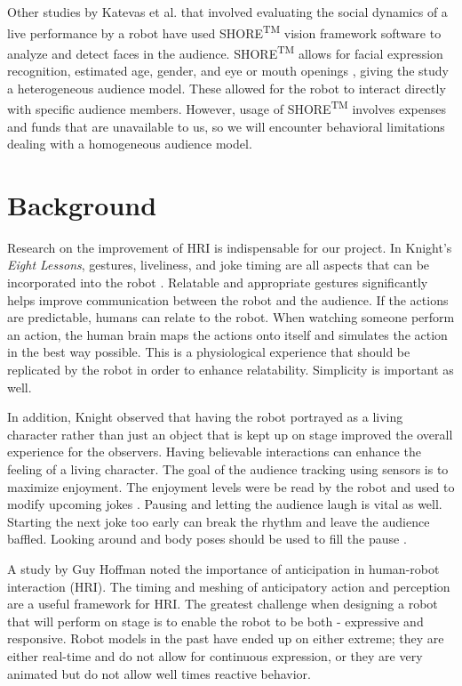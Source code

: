 \documentclass[onecolumn, draftclsnofoot,10pt, compsoc]{IEEEtran}
\begin{document}
Other studies by Katevas et al. \cite{KatevasRobot:2014} that involved evaluating the social dynamics of a live performance by a robot have used SHORE\textsuperscript{TM} vision framework software to analyze and detect faces in the audience. SHORE\textsuperscript{TM} allows for facial expression recognition, estimated age, gender, and eye or mouth openings \cite{SHORE}, giving the study a heterogeneous audience model. These allowed for the robot to interact directly with specific audience members. However, usage of SHORE\textsuperscript{TM} involves expenses and funds that are unavailable to us, so we will encounter behavioral limitations dealing with a homogeneous audience model.


\section{Background}

Research on the improvement of HRI is indispensable for our project. In Knight's \textit{Eight Lessons}, gestures, liveliness, and joke timing are all aspects that can be incorporated into the robot {\cite{KnightEightLessons:2011}}.
Relatable and appropriate gestures significantly helps improve communication between the robot and the audience. If the actions are predictable, humans can relate to the robot.
When watching someone perform an action, the human brain maps the actions onto itself and simulates the action in the best way possible. This is a physiological experience that should be replicated by the robot in order to enhance relatability. Simplicity is important as well. {\cite{KnightEightLessons:2011}}


In addition, Knight observed that having the robot portrayed as a living character rather than just an object that is kept up on stage improved the overall experience for the observers. Having believable interactions can enhance the feeling of a living character.
The goal of the audience tracking using sensors is to maximize enjoyment. The enjoyment levels were be read by the robot and used to modify upcoming jokes {\cite{KnightEightLessons:2011}}. Pausing and letting the audience laugh is vital as well. Starting the next joke too early can break the rhythm and leave the audience baffled. Looking around and body poses should be used to fill the pause {\cite{KnightEightLessons:2011}}.

A study by Guy Hoffman {\cite{hoffman2010anticipation}} noted the importance of anticipation in human-robot interaction (HRI). The timing and meshing of anticipatory action and perception are a useful framework for HRI. The greatest challenge when designing a robot that will perform on stage is to enable the robot to be both - expressive and responsive. Robot models in the past have ended up on either extreme; they are either real-time and do not allow for continuous expression, or they are very animated but do not allow well times reactive behavior.
\end{document}
